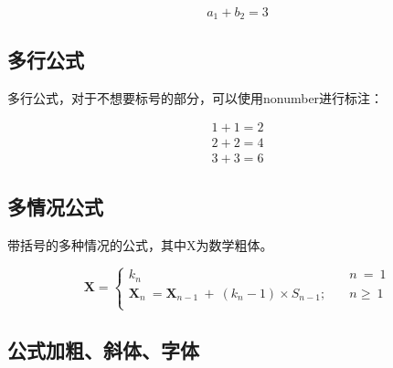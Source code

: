 \documentclass[AutoFakeBold]{LZUThesis-PgD&PhD}
\begin{document}
\begin{equation}\label{eq:sip}
  a_1 + b_2 = 3
\end{equation}


\subsection{多行公式}

多行公式，对于不想要标号的部分，可以使用nonumber进行标注：


\begin{gather}\label{eq:add}
1+1=2 \\
2+2=4 \\
3+3=6 \nonumber
\end{gather}

\subsection{多情况公式}
带括号的多种情况的公式，其中X为数学粗体。


\begin{equation}\label{eq:multi}
  \mathbf{X}=
    \begin{cases}
      k_n \quad & n \ = \ 1 \\
      \mathbf{X}_n \ = \mathbf{X}_{n-1}\ +\ (k_n-1)\times S_{n-1};
      \quad & n \geq \ 1\\
    \end{cases}
\end{equation}

\subsection{公式加粗、斜体、字体}
\end{document}
